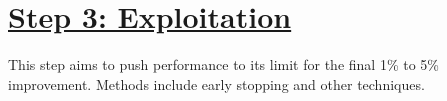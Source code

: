 \documentclass{tufte-handout}
\begin{document}
\section{\underline{Step 3: Exploitation}}\label{sec:exploitation}

This step aims to push performance to its limit for the final 1\% to 5\% improvement.
Methods include early stopping and other techniques.


\nocite{*}


\end{document}
